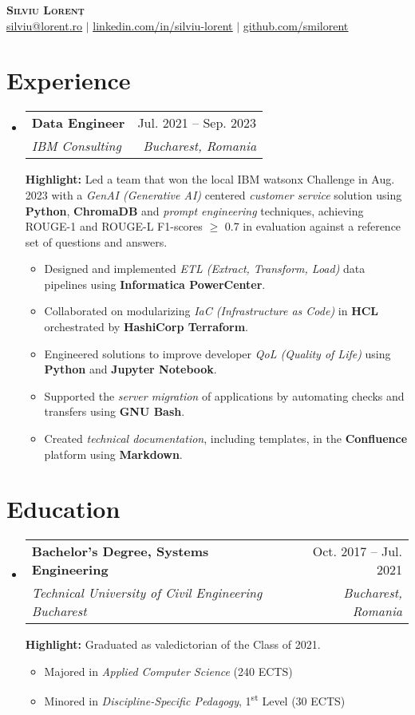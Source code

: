 \documentclass[a4paper,11pt]{article}
\makeatletter
\newcommand{\resumeSubheading}[4]{%
\vspace{-2pt}\item
\begin{tabular*}{0.97\textwidth}[t]{l@{\extracolsep{\fill}}r}
    \textbf{#1} & #2 \\
    \textit{\small#3} & \textit{\small #4} \\
\end{tabular*}\vspace{-7pt}
}
\newcommand{\resumeHighlight}[1]{%
    \par\vspace{7pt}%
    {\small{\textbf{Highlight:} #1}}%
    \vspace{-4pt}%
}
\newcommand{\resumeItem}[1]{\item\small{#1 \vspace{-2pt}}}
\newcommand{\resumeSubHeadingListStart}{\begin{itemize}[leftmargin=0.15in, label={}]}
\newcommand{\resumeSubHeadingListEnd}{\end{itemize}}
\newcommand{\resumeItemListStart}{\begin{itemize}}
\newcommand{\resumeItemListEnd}{\end{itemize}\vspace{-5pt}}
\makeatother
\begin{document}
\begin{center}
    \textbf{\Huge \scshape Silviu Lorenț} \\ \vspace{1pt}
    \href{mailto:silviu@lorent.ro}{\uline{silviu@lorent.ro}} $|$
    \href{https://linkedin.com/in/silviu-lorent}{\uline{linkedin.com/in/silviu-lorent}} $|$
    \href{https://github.com/smilorent}{\uline{github.com/smilorent}}
\end{center}

\section{Experience}
    \resumeSubHeadingListStart
        \resumeSubheading
            {Data Engineer}{Jul. 2021 -- Sep. 2023}
            {IBM Consulting}{Bucharest, Romania}
            \resumeHighlight{Led a team that won the local IBM watsonx Challenge in Aug. 2023 with a \emph{GenAI (Generative AI)} centered \emph{customer service} solution using \textbf{Python}, \textbf{ChromaDB} and \emph{prompt engineering} techniques, achieving ROUGE-1 and ROUGE-L F1-scores $\geq$ 0.7 in evaluation against a reference set of questions and answers.}
            \resumeItemListStart
                \resumeItem{Designed and implemented \emph{ETL (Extract, Transform, Load)} data pipelines using \textbf{Informatica PowerCenter}.}
                \resumeItem{Collaborated on modularizing \emph{IaC (Infrastructure as Code)} in \textbf{HCL} orchestrated by \textbf{HashiCorp Terraform}.}
                \resumeItem{Engineered solutions to improve developer \emph{QoL (Quality of Life)} using \textbf{Python} and \textbf{Jupyter Notebook}.}
                \resumeItem{Supported the \emph{server migration} of applications by automating checks and transfers using \textbf{GNU Bash}.}
                \resumeItem{Created \emph{technical documentation}, including templates, in the \textbf{Confluence} platform using \textbf{Markdown}.}
            \resumeItemListEnd
    \resumeSubHeadingListEnd

\section{Education}
    \resumeSubHeadingListStart
        \resumeSubheading
            {Bachelor's Degree, Systems Engineering}{Oct. 2017 -- Jul. 2021}
            {Technical University of Civil Engineering Bucharest}{Bucharest, Romania}
            \resumeHighlight{Graduated as valedictorian of the Class of 2021.}
            \resumeItemListStart
                \resumeItem{Majored in \emph{Applied Computer Science} (240 ECTS)}
                \resumeItem{Minored in \emph{Discipline-Specific Pedagogy}, 1\textsuperscript{st} Level (30 ECTS)}
            \resumeItemListEnd
    \resumeSubHeadingListEnd
\end{document}

